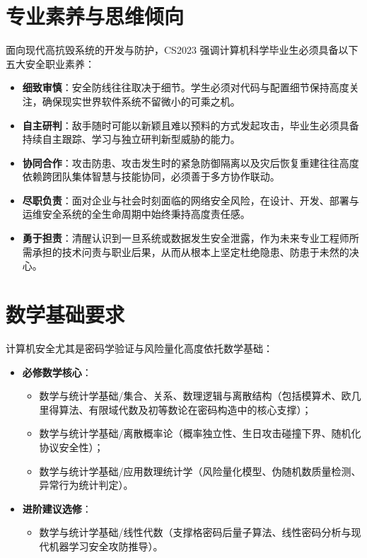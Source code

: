 \section{专业素养与思维倾向}

面向现代高抗毁系统的开发与防护，CS2023 强调计算机科学毕业生必须具备以下五大安全职业素养：
\begin{itemize}\setlength{\itemsep}{0pt}\setlength{\parskip}{0pt}
    \item \textbf{细致审慎}：安全防线往往取决于细节。学生必须对代码与配置细节保持高度关注，确保现实世界软件系统不留微小的可乘之机。
    \item \textbf{自主研判}：敌手随时可能以新颖且难以预料的方式发起攻击，毕业生必须具备持续自主跟踪、学习与独立研判新型威胁的能力。
    \item \textbf{协同合作}：攻击防患、攻击发生时的紧急防御隔离以及灾后恢复重建往往高度依赖跨团队集体智慧与技能协同，必须善于多方协作联动。
    \item \textbf{尽职负责}：面对企业与社会时刻面临的网络安全风险，在设计、开发、部署与运维安全系统的全生命周期中始终秉持高度责任感。
    \item \textbf{勇于担责}：清醒认识到一旦系统或数据发生安全泄露，作为未来专业工程师所需承担的技术问责与职业后果，从而从根本上坚定杜绝隐患、防患于未然的决心。
\end{itemize}

\section{数学基础要求}

计算机安全尤其是密码学验证与风险量化高度依托数学基础：
\begin{itemize}\setlength{\itemsep}{0pt}\setlength{\parskip}{0pt}
    \item \textbf{必修数学核心}：
    \begin{itemize}\setlength{\itemsep}{0pt}\setlength{\parskip}{0pt}
        \item 数学与统计学基础/集合、关系、数理逻辑与离散结构（包括模算术、欧几里得算法、有限域代数及初等数论在密码构造中的核心支撑）；
        \item 数学与统计学基础/离散概率论（概率独立性、生日攻击碰撞下界、随机化协议安全性）；
        \item 数学与统计学基础/应用数理统计学（风险量化模型、伪随机数质量检测、异常行为统计判定）。
    \end{itemize}
    \item \textbf{进阶建议选修}：
    \begin{itemize}\setlength{\itemsep}{0pt}\setlength{\parskip}{0pt}
        \item 数学与统计学基础/线性代数（支撑格密码后量子算法、线性密码分析与现代机器学习安全攻防推导）。
    \end{itemize}
\end{itemize}

